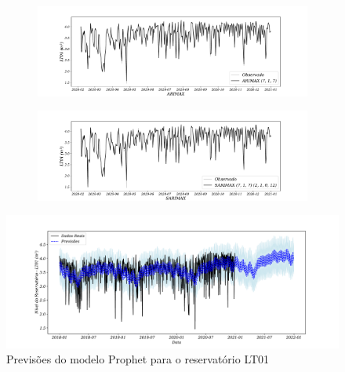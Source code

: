 \begin{figure}[H]
	\centering
	\caption{Comparação entre ARIMAX e SARIMAX}
	\begin{subfigure}{1\textwidth}
			\includegraphics[width=\linewidth]{Modelos/Figuras/ARIMAX}
			
			\label{fig:1-arimax}
		\end{subfigure}
	\hfill
	
	\begin{subfigure}{1\textwidth}
			\includegraphics[width=\linewidth]{Modelos/Figuras/SARIMAX}
			
			\label{fig:1-sarimax}	
		\end{subfigure}


\end{figure}






\begin{figure}[H]
	\centering
	\caption{Previsões do modelo Prophet para o reservatório LT01}\label{fig:prophet1}
	\includegraphics[width=1\linewidth]{Apendices/Figuras/modelagem-24h/prophet1}
	

\end{figure}



